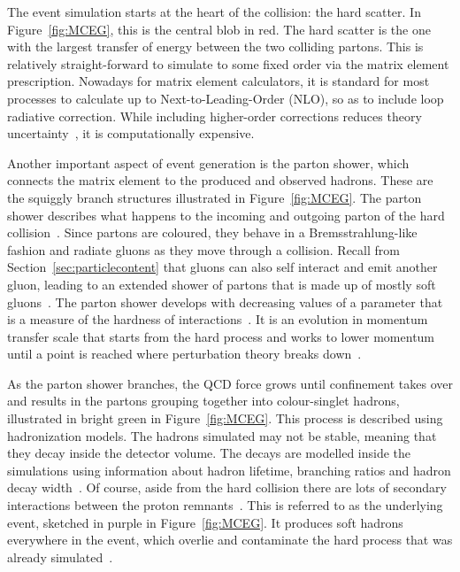The event simulation starts at the heart of the collision: the hard scatter. In Figure~\ref{fig:MCEG}, this is the central blob in red. The hard scatter is the one with the largest transfer of energy between the two colliding partons. This is relatively straight-forward to simulate to some fixed order via the matrix element prescription. Nowadays for matrix element calculators, it is standard for most processes to calculate up to Next-to-Leading-Order (NLO), so as to include loop radiative correction. While including higher-order corrections reduces theory uncertainty~\cite{gutschow_lecture}, it is  computationally expensive.

Another important aspect of event generation is the parton shower, which connects the matrix element to the produced and observed hadrons. These are the squiggly branch structures illustrated in Figure~\ref{fig:MCEG}. The parton shower describes what happens to the incoming and outgoing parton of the hard collision~\cite{seymour2013monte}. Since partons are coloured, they behave in a Bremsstrahlung-like fashion and radiate gluons as they move through a collision. Recall from Section~\ref{sec:particlecontent} that gluons can also self interact and emit another gluon, leading to an extended shower of partons that is made up of mostly soft gluons~\cite{seymour2013monte}. The parton shower develops with decreasing values of a parameter that is a
measure of the hardness of interactions~\cite{Nagy:98014034}. It is an evolution in momentum transfer scale that starts from the hard process and works to lower momentum until a point is reached where perturbation theory breaks down~\cite{seymour2013monte}. 

As the parton shower branches, the QCD force grows until confinement takes over and results in the partons grouping together into colour-singlet hadrons, illustrated in bright green in Figure~\ref{fig:MCEG}. This process is described using hadronization models. The hadrons simulated may not be stable, meaning that they decay inside the detector volume. The decays are modelled inside the simulations using information about hadron lifetime, branching ratios and hadron decay width~\cite{Cabras:2743914}. Of course, aside from the hard collision there are lots of secondary interactions between the proton remnants~\cite{seymour2013monte}. This is referred to as the underlying event, sketched in purple in Figure~\ref{fig:MCEG}. It produces soft hadrons everywhere in the event, which overlie and contaminate the hard process that was already simulated~\cite{seymour2013monte}.

